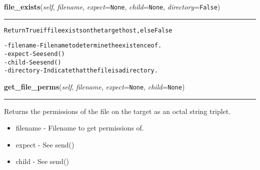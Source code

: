     \label{shutit_global:ShutIt:file_exists}

    \vspace{0.5ex}

\hspace{.8\funcindent}\begin{boxedminipage}{\funcwidth}

    \raggedright \textbf{file\_exists}(\textit{self}, \textit{filename}, \textit{expect}={\tt None}, \textit{child}={\tt None}, \textit{directory}={\tt False})

    \vspace{-1.5ex}

    \rule{\textwidth}{0.5\fboxrule}
\setlength{\parskip}{2ex}
\begin{alltt}
Return True if file exists on the target host, else False

- filename     - Filename to determine the existence of.
- expect       - See send()
- child        - See send()
- directory    - Indicate that the file is a directory.
\end{alltt}

\setlength{\parskip}{1ex}
    \end{boxedminipage}

    \label{shutit_global:ShutIt:get_file_perms}

    \vspace{0.5ex}

\hspace{.8\funcindent}\begin{boxedminipage}{\funcwidth}

    \raggedright \textbf{get\_file\_perms}(\textit{self}, \textit{filename}, \textit{expect}={\tt None}, \textit{child}={\tt None})

    \vspace{-1.5ex}

    \rule{\textwidth}{0.5\fboxrule}
\setlength{\parskip}{2ex}
    Returns the permissions of the file on the target as an octal string 
    triplet.

    \begin{itemize}
    \setlength{\parskip}{0.6ex}
      \item filename  - Filename to get permissions of.

      \item expect    - See send()

      \item child     - See send()

    \end{itemize}

\setlength{\parskip}{1ex}
    \end{boxedminipage}

